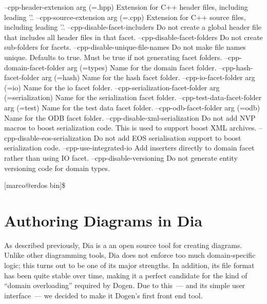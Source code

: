 \documentclass{book}
\begin{document}
\begin{pseudocode}[backgroundcolor=\color{lightgray}]
--cpp-header-extension arg (=.hpp)    Extension for C++ header files,
                                      including leading '.'.
--cpp-source-extension arg (=.cpp)    Extension for C++ source files,
                                      including leading '.'.
--cpp-disable-facet-includers         Do not create a global header file that
                                      includes all header files in that
                                      facet.
--cpp-disable-facet-folders           Do not create sub-folders for facets.
--cpp-disable-unique-file-names       Do not make file names unique. Defaults
                                      to true. Must be true if not generating
                                      facet folders.
--cpp-domain-facet-folder arg (=types)
                                      Name for the domain facet folder.
--cpp-hash-facet-folder arg (=hash)   Name for the hash facet folder.
--cpp-io-facet-folder arg (=io)       Name for the io facet folder.
--cpp-serialization-facet-folder arg (=serialization)
                                      Name for the serialization facet
                                      folder.
--cpp-test-data-facet-folder arg (=test\data)
                                      Name for the test data facet folder.
--cpp-odb-facet-folder arg (=odb)     Name for the ODB facet folder.
--cpp-disable-xml-serialization       Do not add NVP macros to boost
                                      serialization code. This is used to
                                      support boost XML archives.
--cpp-disable-eos-serialization       Do not add EOS serialisation support to
                                      boost serialization code.
--cpp-use-integrated-io               Add inserters directly to domain facet
                                      rather than using IO facet.
--cpp-disable-versioning              Do not generate entity versioning code
                                      for domain types.

[marco@erdos bin]\$
\end{pseudocode}

\chapter{Authoring Diagrams in Dia}

As described previously, Dia is a an open source tool for creating
diagrams. Unlike other diagramming tools, Dia does not enforce too
much domain-specific logic; this turns out to be one of its major
strengths. In addition, its file format has been quite stable over
time, making it a perfect candidate for the kind of ``domain
overloading'' required by Dogen. Due to this~--- and its simple user
interface~--- we decided to make it Dogen's first front end tool.
\end{document}
